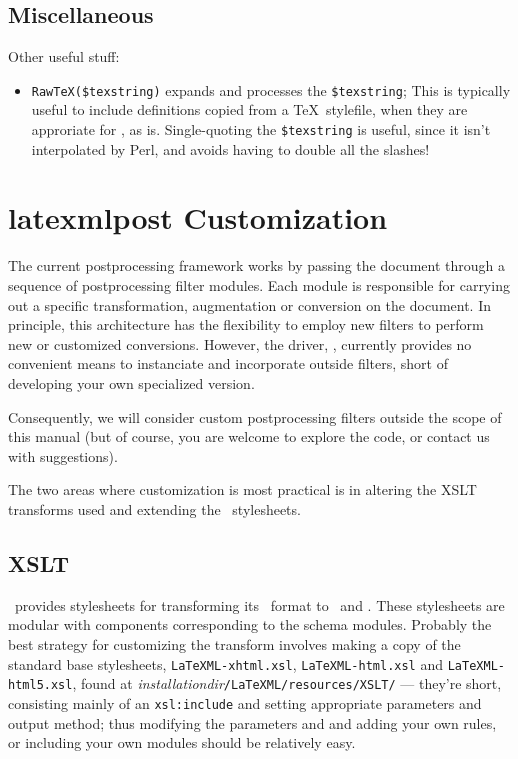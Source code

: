 \documentclass{book}
\newcommand{\ltxcode}{\lstinline[style=inlinelatexml]}
\begin{document}
\subsection{Miscellaneous}\label{customization.latexml.misc}
Other useful stuff:
\begin{itemize}
\item \ltxcode|RawTeX($texstring)| expands and processes the \ltxcode|$texstring|;
This is typically useful to include definitions copied from a \TeX\ stylefile,
when they are approriate for \LaTeXML, as is.
Single-quoting the \ltxcode|$texstring| is useful, since it isn't interpolated
by Perl, and avoids having to double all the slashes!
\end{itemize}


\section{latexmlpost Customization}\label{customization.latexmlpost}
The current postprocessing framework works by passing the document through
a sequence of postprocessing filter modules. Each module is responsible
for carrying out a specific transformation, augmentation or conversion
on the document.   In principle, this architecture has the flexibility to
employ new filters to perform new or customized conversions.
However, the driver, , currently provides no
convenient means to instanciate and incorporate outside filters, short
of developing your own specialized version.

Consequently, we will consider custom postprocessing filters outside
the scope of this manual (but of course, you are welcome to explore
the code, or contact us with suggestions).

The two areas where customization is most practical is in altering
the XSLT transforms used and extending the \CSS\ stylesheets.

\subsection{XSLT}\label{customization.latexmlpost.xslt}
\LaTeXML\ provides stylesheets for transforming its \XML\ format
to \XHTML\ and \HTML. These stylesheets are modular with components
corresponding to the schema modules.  Probably the best strategy
for customizing the transform involves making a copy of the standard
base stylesheets, \texttt{LaTeXML-xhtml.xsl},
\texttt{LaTeXML-html.xsl} and
\texttt{LaTeXML-html5.xsl},  found at
\textit{installationdir}\texttt{/LaTeXML/resources/XSLT/}
--- they're short, consisting mainly of an \texttt{xsl:include}
and setting appropriate parameters and output method;
thus modifying the parameters and and adding your own rules,
or including your own modules should be relatively easy.
\end{document}
